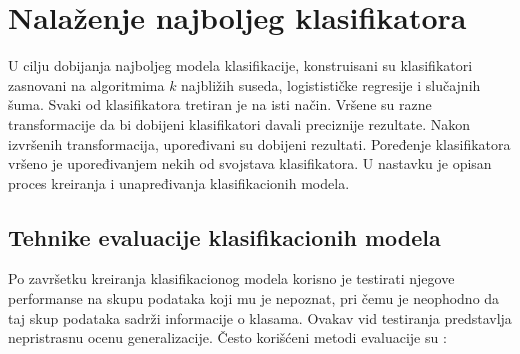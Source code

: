 \documentclass[12pt,oneside]{memoir}
\begin{document}
\section{Nalaženje najboljeg klasifikatora}

U cilju dobijanja najboljeg modela klasifikacije, konstruisani su klasifikatori zasnovani na algoritmima $k$ najbližih suseda, logistističke regresije i slučajnih šuma. Svaki od klasifikatora tretiran je na isti način. Vršene su razne transformacije da bi dobijeni klasifikatori davali preciznije rezultate. Nakon izvršenih transformacija, upoređivani su dobijeni rezultati. Poređenje klasifikatora vršeno je upoređivanjem nekih od svojstava klasifikatora. U nastavku je opisan proces kreiranja i unapređivanja klasifikacionih modela.  

\subsection{Tehnike evaluacije klasifikacionih modela} \label{evaluacija}

Po završetku kreiranja klasifikacionog modela korisno je testirati njegove performanse na skupu podataka koji mu je nepoznat, pri čemu je neophodno da taj skup podataka sadrži informacije o klasama. Ovakav vid testiranja predstavlja nepristrasnu ocenu generalizacije. Često korišćeni metodi evaluacije su  \cite{mitic, mladen, aggarwal, UMLFTA}: 
\end{document}
